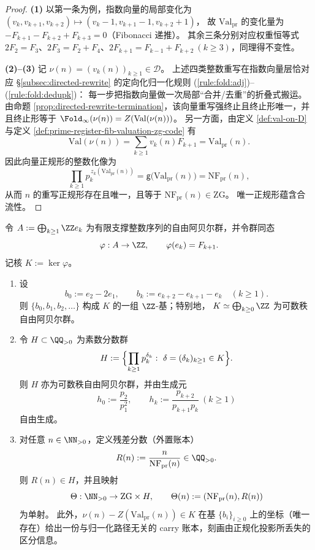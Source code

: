 \begin{proof}
\textbf{(1)} 以第一条为例，指数向量的局部变化为
\(
(v_k,v_{k+1},v_{k+2})\mapsto (v_k-1,v_{k+1}-1,v_{k+2}+1)
\)，
故 \(\mathrm{Val}_{\mathrm{pr}}\) 的变化量为
\(
-F_{k+1}-F_{k+2}+F_{k+3}=0
\)（Fibonacci 递推）。
其余三条分别对应权重恒等式
\(
2F_2=F_3
\)、\(
2F_3=F_2+F_4
\)、\(
2F_{k+1}=F_{k-1}+F_{k+2}\ (k\ge 3)
\)，同理得不变性。

\textbf{(2)--(3)} 记 \(\nu(n)=(v_k(n))_{k\ge 1}\in\mathcal D\)。
上述四类整数重写在指数向量层恰对应 \S\ref{subsec:directed-rewrite} 的定向化归一化规则
(\ref{rule:fold:adj})--(\ref{rule:fold:dedupk})：
每一步把指数向量做一次局部“合并/去重”的折叠式搬运。
由命题 \ref{prop:directed-rewrite-termination}，该向量重写强终止且终止形唯一，并且终止形等于 \(\Fold_\infty(\nu(n))=Z(\mathrm{Val}(\nu(n)))\)。
另一方面，由定义 \ref{def:val-on-D} 与定义 \ref{def:prime-register-fib-valuation-zg-code} 有
\[
\mathrm{Val}(\nu(n))=\sum_{k\ge 1}v_k(n)F_{k+1}=\mathrm{Val}_{\mathrm{pr}}(n).
\]
因此向量正规形的整数化像为
\[
\prod_{k\ge 1} p_k^{\,z_k(\mathrm{Val}_{\mathrm{pr}}(n))}
=\mathsf{g}\bigl(\mathrm{Val}_{\mathrm{pr}}(n)\bigr)
=\mathrm{NF}_{\mathrm{pr}}(n),
\]
从而 \(n\) 的重写正规形存在且唯一，且等于 \(\mathrm{NF}_{\mathrm{pr}}(n)\in\mathrm{ZG}\)。
唯一正规形蕴含合流性。
\end{proof}

\begin{theorem}\label{thm:prime-register-residual-ledger-group}
令 \(A:=\bigoplus_{k\ge 1}\ZZ e_k\) 为有限支撑整数序列的自由阿贝尔群，并令群同态
\[
\varphi:A\to\ZZ,\qquad \varphi(e_k)=F_{k+1}.
\]
记核 \(K:=\ker\varphi\)。

\begin{enumerate}
  \item 设
  \[
  b_0:=e_2-2e_1,\qquad b_k:=e_{k+2}-e_{k+1}-e_k\quad (k\ge 1).
  \]
  则 \(\{b_0,b_1,b_2,\dots\}\) 构成 \(K\) 的一组 \(\ZZ\)-基；特别地，
  \(K\simeq \bigoplus_{k\ge 0}\ZZ\) 为可数秩自由阿贝尔群。

  \item 令 \(H\subset\QQ_{>0}\) 为素数分数群
  \[
  H:=\Bigl\{\prod_{k\ge 1} p_k^{\delta_k}:\ \delta=(\delta_k)_{k\ge 1}\in K\Bigr\}.
  \]
  则 \(H\) 亦为可数秩自由阿贝尔群，并由生成元
  \[
  h_0:=\frac{p_2}{p_1^2},\qquad h_k:=\frac{p_{k+2}}{p_{k+1}p_k}\ (k\ge 1)
  \]
  自由生成。

  \item 对任意 \(n\in\NN_{>0}\)，定义残差分数（外置账本）
  \[
  R(n):=\frac{n}{\mathrm{NF}_{\mathrm{pr}}(n)}\in\QQ_{>0}.
  \]
  则 \(R(n)\in H\)，并且映射
  \[
  \Theta:\NN_{>0}\to \mathrm{ZG}\times H,\qquad \Theta(n):=(\mathrm{NF}_{\mathrm{pr}}(n),R(n))
  \]
  为单射。
  此外，\(\nu(n)-Z(\mathrm{Val}_{\mathrm{pr}}(n))\in K\) 在基 \(\{b_i\}_{i\ge 0}\) 上的坐标（唯一存在）给出一份与归一化路径无关的 carry 账本，刻画由正规化投影所丢失的区分信息。
\end{enumerate}
\end{theorem}


